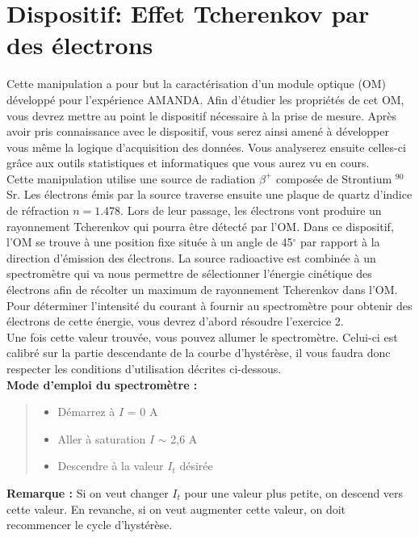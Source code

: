 \section{Dispositif: Effet Tcherenkov par des électrons}

Cette manipulation a pour but la caractérisation d'un module optique (OM) développé pour l'expérience AMANDA. Afin d'étudier les propriétés de cet OM, vous devrez mettre au point le dispositif nécessaire à la prise de mesure. Après avoir pris connaissance avec le dispositif, vous serez ainsi amené à développer vous même la logique d'acquisition des données. Vous analyserez ensuite celles-ci grâce aux outils statistiques et informatiques que vous aurez vu en cours. \\

Cette manipulation utilise une source de radiation $\beta^+$ composée de Strontium $^{90}$Sr. Les électrons émis par la source traverse ensuite une plaque de quartz d'indice de réfraction  $n = 1.478$. Lors de leur passage, les électrons vont produire un rayonnement Tcherenkov qui pourra être détecté par l'OM. Dans ce dispositif, l'OM se trouve à une position fixe située à un angle de 45$^{\circ}$ par rapport à la direction d'émission des électrons. La source radioactive est combinée à un spectromètre qui va nous permettre de sélectionner l'énergie cinétique des électrons afin de récolter un maximum de rayonnement Tcherenkov dans l'OM. Pour déterminer l'intensité du courant à fournir au spectromètre pour obtenir des électrons de cette énergie, vous devrez d'abord résoudre l'exercice 2.\\

Une fois cette valeur trouvée, vous pouvez allumer le spectromètre. Celui-ci est calibré sur la partie descendante de la courbe d'hystérèse, il vous faudra donc respecter les conditions d'utilisation décrites ci-dessous.\\

\textbf{Mode d'emploi du spectromètre :}
\begin{quote}
    \begin{itemize}
        \item Démarrez à $I$ = 0 A
        \item Aller à saturation $I$ $\sim$ 2,6 A
        \item Descendre à la valeur $I_t$ désirée
    \end{itemize}
\end{quote}
\textbf{Remarque :} Si on veut changer $I_t$ pour une valeur plus petite, on descend vers cette valeur. En revanche, si on veut augmenter cette valeur, on doit recommencer le cycle d'hystérèse. 

